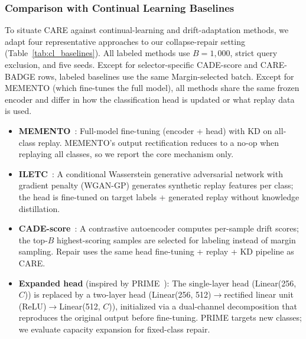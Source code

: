 \documentclass[journal]{IEEEtran}
\newcommand{\ours}{CARE}  %
\begin{document}
\subsubsection{Comparison with Continual Learning Baselines}
\label{sec:cl_baselines}

To situate \ours{} against continual-learning and drift-adaptation methods, we adapt four representative approaches to our collapse-repair setting (Table~\ref{tab:cl_baselines}).
All labeled methods use $B{=}1{,}000$, strict query exclusion, and five seeds. Except for selector-specific CADE-score and \ours{}-BADGE rows, labeled baselines use the same Margin-selected batch. Except for MEMENTO (which fine-tunes the full model), all methods share the same frozen encoder and differ in how the classification head is updated or what replay data is used.

\begin{itemize}
  \item \textbf{MEMENTO}~\cite{cerasuolo2024memento}: Full-model fine-tuning (encoder + head) with KD on all-class replay. MEMENTO's output rectification reduces to a no-op when replaying all classes, so we report the core mechanism only.
  \item \textbf{ILETC}~\cite{zhu2023iletc}: A conditional Wasserstein generative adversarial network with gradient penalty (WGAN-GP) generates synthetic replay features per class; the head is fine-tuned on target labels + generated replay without knowledge distillation.
  \item \textbf{CADE-score}~\cite{yang2021cade}: A contrastive autoencoder computes per-sample drift scores; the top-$B$ highest-scoring samples are selected for labeling instead of margin sampling. Repair uses the same head fine-tuning + replay + KD pipeline as \ours{}.
  \item \textbf{Expanded head} (inspired by PRIME~\cite{prime2025}): The single-layer head (Linear(256, $C$)) is replaced by a two-layer head (Linear(256, 512)$\to$rectified linear unit (ReLU)$\to$Linear(512, $C$)), initialized via a dual-channel decomposition that reproduces the original output before fine-tuning. PRIME targets new classes; we evaluate capacity expansion for fixed-class repair.
\end{itemize}
\end{document}
